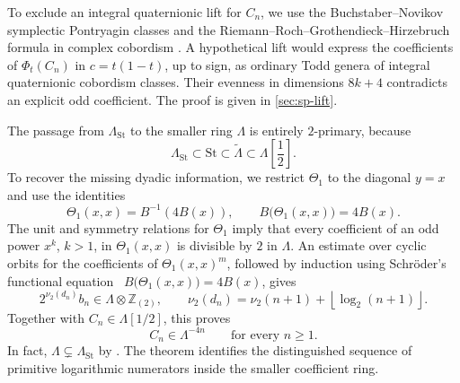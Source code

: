 \documentclass[14pt,dvipsnames]{extarticle}
\numberwithin{equation}{subsection}
\theoremstyle{plain}
\theoremstyle{definition}
\theoremstyle{definition}
\newcommand{\St}{\mathrm{St}}
\newcommand{\LambdaSt}{\Lambda_{\mathrm{St}}}
\newcommand{\Ztwo}{\mathbb{Z}_{(2)}}
\begin{document}
To exclude an integral quaternionic lift for $C_n$, we use the
Buchstaber--Novikov symplectic Pontryagin classes and the
Riemann--Roch--Grothendieck--Hirzebruch formula in complex cobordism
\cite[Theorem~2.4, formula~(29)]{BV24}.
A hypothetical lift would express the coefficients of $\Phi_t(C_n)$ in
$c=t(1-t)$, up to sign, as ordinary Todd genera of integral quaternionic
cobordism classes. Their evenness in dimensions $8k+4$
\cite[Corollary~2(ii), p.~279]{AH59} contradicts an explicit odd coefficient.
The proof is given in \cref{sec:sp-lift}.

The passage from $\LambdaSt$ to the smaller ring $\Lambda$ is entirely
$2$-primary, because
\[
 \LambdaSt\subset\St\subset\widetilde\Lambda\subset\Lambda\!\left[\frac12\right].
\]
To recover the missing dyadic information, we restrict $\Theta_1$ to the
diagonal $y=x$ and use the identities
\[
 \Theta_1(x,x)=B^{-1}(4B(x)),
 \qquad
 B\bigl(\Theta_1(x,x)\bigr)=4B(x).
\]
The unit and symmetry relations for $\Theta_1$ imply that every coefficient
of an odd power $x^k$, $k>1$, in $\Theta_1(x,x)$ is divisible by $2$ in
$\Lambda$. An estimate over cyclic orbits for the coefficients of $\Theta_1(x,x)^m$,
followed by induction using Schröder's functional
equation~\cite[\S~7]{MNT17} $B\bigl(\Theta_1(x,x)\bigr)=4B(x)$, gives
\[
 2^{\nu_2(d_n)}b_n\in\Lambda\otimes\Ztwo,
 \qquad
 \nu_2(d_n)=\nu_2(n+1)+\left\lfloor\log_2(n+1)\right\rfloor.
\]
Together with $C_n\in\Lambda[1/2]$, this proves
\[
 C_n\in\Lambda^{-4n}\qquad\text{for every }n\geq1.
\]
In fact, $\Lambda\subsetneq\LambdaSt$ by \cite[Corollary~5.8]{Buc78}.
The theorem identifies the distinguished sequence of primitive logarithmic
numerators inside the smaller coefficient ring.
\end{document}
